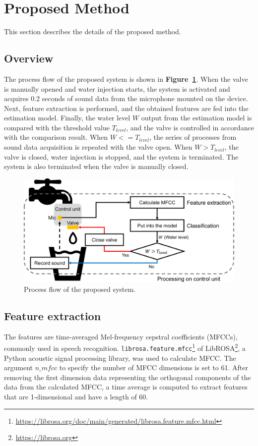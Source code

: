 \documentclass[manuscript,screen,anonymous,review]{acmart}
\newcommand\figref[1]{\textbf{Figure~\ref{fig:#1}}}
\begin{document}
\section{Proposed Method}
\label{sec:method}
This section describes the details of the proposed method.

\subsection{Overview}
The process flow of the proposed system is shown in \figref{method}. When the valve is manually opened and water injection starts, the system is activated and acquires 0.2 seconds of sound data from the microphone mounted on the device. Next, feature extraction is performed, and the obtained features are fed into the estimation model. Finally, the water level $W$ output from the estimation model is compared with the threshold value $T_{level}$, and the valve is controlled in accordance with the comparison result. When $W<=T_{level}$, the series of processes from sound data acquisition is repeated with the valve open. When $W>T_{level}$, the valve is closed, water injection is stopped, and the system is terminated. The system is also terminated when the valve is manually closed.

\begin{figure}[!t]
  \centering
  \includegraphics[width=0.8\linewidth]{figures/method.eps}
  \caption{Process flow of the proposed system.}
  \label{fig:method}
\end{figure}


\subsection{Feature extraction}
The features are time-averaged Mel-frequency cepstral coefficients (MFCCs), commonly used in speech recognition. \texttt{librosa.feature.mfcc}\footnote{\url{https://librosa.org/doc/main/generated/librosa.feature.mfcc.html}} of LibROSA\footnote{\url{https://librosa.org}}, a Python acoustic signal processing library, was used to calculate MFCC. The argument $n\_mfcc$ to specify the number of MFCC dimensions is set to 61. After removing the first dimension data representing the orthogonal components of the data from the calculated MFCC, a time average is computed to extract features that are 1-dimensional and have a length of 60.
\end{document}
